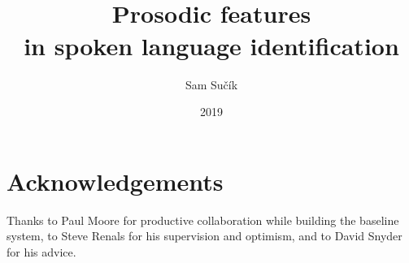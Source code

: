 \documentclass[bsc,frontabs,twoside,singlespacing,parskip,deptreport]{infthesis}
\begin{document}
\title{\vspace{-5.0cm}  \vspace{1cm} \\ Prosodic features \\in spoken language identification}

\author{Sam Su\v{c}\'ik}

\project{\vspace{3cm}{\bf MInf Project (Part 1) Report}}

\date{2019}


\maketitle

\section*{Acknowledgements}{
  Thanks to Paul Moore for productive collaboration while building the baseline system, to Steve Renals for his supervision and optimism, and to David Snyder for his advice.
}

\tableofcontents

\end{document}
